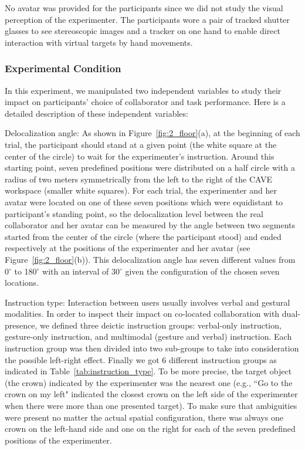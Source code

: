 No avatar was provided for the participants since we did not study the visual perception of the experimenter. The participants wore a pair of tracked shutter glasses to see stereoscopic images and a tracker on one hand to enable direct interaction with virtual targets by hand movements.

\subsubsection{Experimental Condition}
In this experiment, we manipulated two independent variables to study their impact on participants' choice of collaborator and task performance. Here is a detailed description of these independent variables:

Delocalization angle: As shown in Figure~\ref{fig:2_floor}(a), at the beginning of each trial, the participant should stand at a given point (the white square at the center of the circle) to wait for the experimenter's instruction. Around this starting point, seven predefined positions were distributed on a half circle with a radius of two meters symmetrically from the left to the right of the CAVE workspace (smaller white squares). For each trial, the experimenter and her avatar were located on one of these seven positions which were equidistant to participant's standing point, so the delocalization level between the real collaborator and her avatar can be measured by the angle between two segments started from the center of the circle (where the participant stood) and ended respectively at the positions of the experimenter and her avatar (see Figure~\ref{fig:2_floor}(b)). This delocalization angle has seven different values from 0$^\circ$ to 180$^\circ$ with an interval of 30$^\circ$ given the configuration of the chosen seven locations.

Instruction type: Interaction between users usually involves verbal and gestural modalities. In order to inspect their impact on co-located collaboration with dual-presence, we defined three deictic instruction groups: verbal-only instruction, gesture-only instruction, and multimodal (gesture and verbal) instruction. Each instruction group was then divided into two sub-groups to take into consideration the possible left-right effect. Finally we got 6 different instruction groups as indicated in Table~\ref{tab:instruction_type}. To be more precise, the target object (the crown) indicated by the experimenter was the nearest one (e.g., ``Go to the crown on my left" indicated the closest crown on the left side of the experimenter when there were more than one presented target). To make sure that ambiguities were present no matter the actual spatial configuration, there was always one crown on the left-hand side and one on the right for each of the seven predefined positions of the experimenter.

